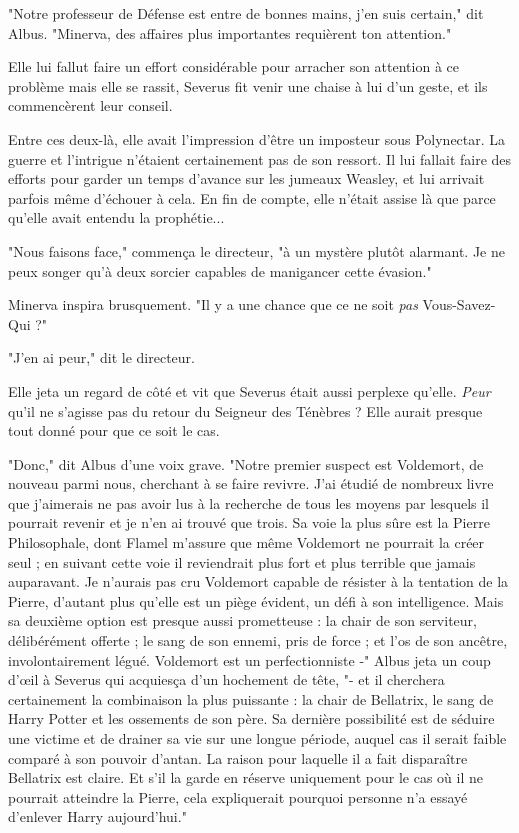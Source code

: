 "Notre professeur de Défense est entre de bonnes mains, j'en suis certain," dit Albus. "Minerva, des affaires plus importantes requièrent ton attention."

Elle lui fallut faire un effort considérable pour arracher son attention à ce problème mais elle se rassit, Severus fit venir une chaise à lui d'un geste, et ils commencèrent leur conseil.

Entre ces deux-là, elle avait l'impression d'être un imposteur sous Polynectar. La guerre et l'intrigue n'étaient certainement pas de son ressort. Il lui fallait faire des efforts pour garder un temps d'avance sur les jumeaux Weasley, et lui arrivait parfois même d'échouer à cela. En fin de compte, elle n'était assise là que parce qu'elle avait entendu la prophétie...

"Nous faisons face," commença le directeur, "à un mystère plutôt alarmant. Je ne peux songer qu'à deux sorcier capables de manigancer cette évasion."

Minerva inspira brusquement. "Il y a une chance que ce ne soit \emph{pas } Vous-Savez-Qui ?"

"J'en ai peur," dit le directeur.

Elle jeta un regard de côté et vit que Severus était aussi perplexe qu'elle. \emph{Peur}  qu'il ne s'agisse pas du retour du Seigneur des Ténèbres ? Elle aurait presque tout donné pour que ce soit le cas.

"Donc," dit Albus d'une voix grave. "Notre premier suspect est Voldemort, de nouveau parmi nous, cherchant à se faire revivre. J'ai étudié de nombreux livre que j'aimerais ne pas avoir lus à la recherche de tous les moyens par lesquels il pourrait revenir et je n'en ai trouvé que trois. Sa voie la plus sûre est la Pierre Philosophale, dont Flamel m'assure que même Voldemort ne pourrait la créer seul ; en suivant cette voie il reviendrait plus fort et plus terrible que jamais auparavant. Je n'aurais pas cru Voldemort capable de résister à la tentation de la Pierre, d'autant plus qu'elle est un piège évident, un défi à son intelligence. Mais sa deuxième option est presque aussi prometteuse : la chair de son serviteur, délibérément offerte ; le sang de son ennemi, pris de force ; et l'os de son ancêtre, involontairement légué. Voldemort est un perfectionniste -" Albus jeta un coup d'œil à Severus qui acquiesça d'un hochement de tête, "- et il cherchera certainement la combinaison la plus puissante : la chair de Bellatrix, le sang de Harry Potter et les ossements de son père. Sa dernière possibilité est de séduire une victime et de drainer sa vie sur une longue période, auquel cas il serait faible comparé à son pouvoir d'antan. La raison pour laquelle il a fait disparaître Bellatrix est claire. Et s'il la garde en réserve uniquement pour le cas où il ne pourrait atteindre la Pierre, cela expliquerait pourquoi personne n'a essayé d'enlever Harry aujourd'hui."

